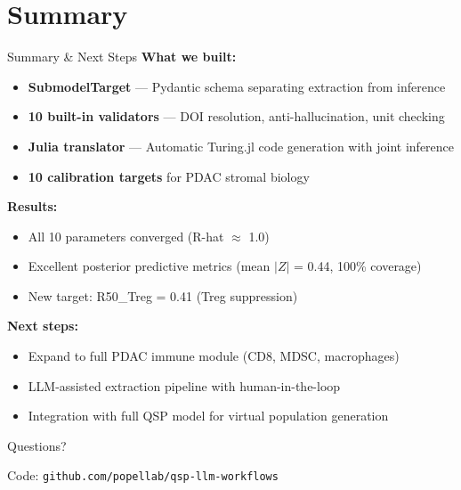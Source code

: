 \documentclass[aspectratio=169,10pt]{beamer}
\begin{document}
\section{Summary}

\begin{frame}{Summary \& Next Steps}
\textbf{What we built:}
\begin{itemize}
    \item \textbf{SubmodelTarget} --- Pydantic schema separating extraction from inference
    \item \textbf{10 built-in validators} --- DOI resolution, anti-hallucination, unit checking
    \item \textbf{Julia translator} --- Automatic Turing.jl code generation with joint inference
    \item \textbf{10 calibration targets} for PDAC stromal biology
\end{itemize}

\vspace{0.5em}
\textbf{Results:}
\begin{itemize}
    \item All 10 parameters converged (R-hat $\approx$ 1.0)
    \item Excellent posterior predictive metrics (mean $|Z|$ = 0.44, 100\% coverage)
    \item New target: R50\_Treg = 0.41 (Treg suppression)
\end{itemize}

\vspace{0.5em}
\textbf{Next steps:}
\begin{itemize}
    \item Expand to full PDAC immune module (CD8, MDSC, macrophages)
    \item LLM-assisted extraction pipeline with human-in-the-loop
    \item Integration with full QSP model for virtual population generation
\end{itemize}
\end{frame}

\begin{frame}
\begin{center}
\Huge Questions?

\vspace{1em}
\normalsize
Code: \texttt{github.com/popellab/qsp-llm-workflows}
\end{center}
\end{frame}
\end{document}
